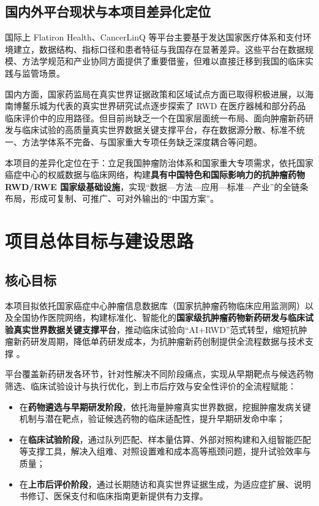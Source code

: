 \documentclass[12pt, a4paper, fontset=mac]{ctexart} %
\begin{document}
\subsection{国内外平台现状与本项目差异化定位}

国际上 Flatiron Health、CancerLinQ 等平台主要基于发达国家医疗体系和支付环境建立，数据结构、指标口径和患者特征与我国存在显著差异\cite{flatiron_overview,cancerlinq_overview,ma2020_flatiron_comparison,birnbaum2020_flatiron_cohort}。这些平台在数据规模、方法学规范和产业协同方面提供了重要借鉴，但难以直接迁移到我国的临床实践与监管场景。

国内方面，国家药监局在真实世界证据政策和区域试点方面已取得积极进展，以海南博鳌乐城为代表的真实世界研究试点逐步探索了 RWD 在医疗器械和部分药品临床评价中的应用路径\cite{NMPA-RWE-Guideline,boao_pilot_rwd,boao_rwd_commentary,nhei_anticancer_eval_guide_2021}。但目前尚缺乏一个在国家层面统一布局、面向肿瘤新药研发与临床试验的高质量真实世界数据关键支撑平台，存在数据源分散、标准不统一、方法学体系不完备、与国家重大专项任务缺乏深度耦合等问题。

本项目的差异化定位在于：立足我国肿瘤防治体系和国家重大专项需求，依托国家癌症中心的权威数据与临床网络，构建\textbf{具有中国特色和国际影响力的抗肿瘤药物 RWD/RWE 国家级基础设施}，实现“数据—方法—应用—标准—产业”的全链条布局，形成可复制、可推广、可对外输出的“中国方案”。

\section{项目总体目标与建设思路}

\subsection{核心目标}

本项目拟依托国家癌症中心肿瘤信息数据库（国家抗肿瘤药物临床应用监测网）以及全国协作医院网络，构建标准化、智能化的\textbf{国家级抗肿瘤药物新药研发与临床试验真实世界数据关键支撑平台}，推动临床试验向“AI+RWD”范式转型，缩短抗肿瘤新药研发周期，降低单药研发成本，为抗肿瘤新药创制提供全流程数据与技术支撑 %
。

平台覆盖新药研发各环节，针对性解决不同阶段痛点，实现从早期靶点与候选药物筛选、临床试验设计与执行优化，到上市后疗效与安全性评价的全流程赋能：

\begin{itemize}
  \item 在\textbf{药物遴选与早期研发阶段}，依托海量肿瘤真实世界数据，挖掘肿瘤发病关键机制与潜在靶点，验证候选药物的临床适配性，提升早期研发命中率；
  \item 在\textbf{临床试验阶段}，通过队列匹配、样本量估算、外部对照构建和入组智能匹配等支撑工具，解决入组难、对照设置难和成本高等瓶颈问题，提升试验效率与质量；
  \item 在\textbf{上市后评价阶段}，通过长期随访和真实世界证据生成，为适应症扩展、说明书修订、医保支付和临床指南更新提供有力支撑。
\end{itemize}
\end{document}
